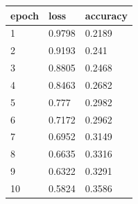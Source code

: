 \begin{tabular}{lll}
\hline
epoch & loss & accuracy \\
\hline
1 & 0.9798 & 0.2189 \\
2 & 0.9193 & 0.241 \\
3 & 0.8805 & 0.2468 \\
4 & 0.8463 & 0.2682 \\
5 & 0.777 & 0.2982 \\
6 & 0.7172 & 0.2962 \\
7 & 0.6952 & 0.3149 \\
8 & 0.6635 & 0.3316 \\
9 & 0.6322 & 0.3291 \\
10 & 0.5824 & 0.3586 \\
\hline
\end{tabular}
